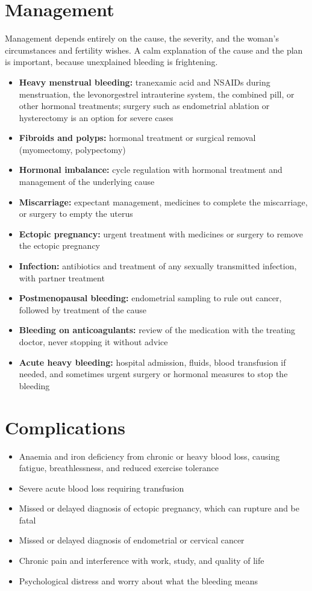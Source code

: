 \section*{Management}
Management depends entirely on the cause, the severity, and the woman's circumstances and fertility wishes. A calm explanation of the cause and the plan is important, because unexplained bleeding is frightening.

\begin{itemize}
    \item \textbf{Heavy menstrual bleeding:} tranexamic acid and NSAIDs during menstruation, the levonorgestrel intrauterine system, the combined pill, or other hormonal treatments; surgery such as endometrial ablation or hysterectomy is an option for severe cases
    \item \textbf{Fibroids and polyps:} hormonal treatment or surgical removal (myomectomy, polypectomy)
    \item \textbf{Hormonal imbalance:} cycle regulation with hormonal treatment and management of the underlying cause
    \item \textbf{Miscarriage:} expectant management, medicines to complete the miscarriage, or surgery to empty the uterus
    \item \textbf{Ectopic pregnancy:} urgent treatment with medicines or surgery to remove the ectopic pregnancy
    \item \textbf{Infection:} antibiotics and treatment of any sexually transmitted infection, with partner treatment
    \item \textbf{Postmenopausal bleeding:} endometrial sampling to rule out cancer, followed by treatment of the cause
    \item \textbf{Bleeding on anticoagulants:} review of the medication with the treating doctor, never stopping it without advice
    \item \textbf{Acute heavy bleeding:} hospital admission, fluids, blood transfusion if needed, and sometimes urgent surgery or hormonal measures to stop the bleeding
\end{itemize}

\section*{Complications}
\begin{itemize}
    \item Anaemia and iron deficiency from chronic or heavy blood loss, causing fatigue, breathlessness, and reduced exercise tolerance
    \item Severe acute blood loss requiring transfusion
    \item Missed or delayed diagnosis of ectopic pregnancy, which can rupture and be fatal
    \item Missed or delayed diagnosis of endometrial or cervical cancer
    \item Chronic pain and interference with work, study, and quality of life
    \item Psychological distress and worry about what the bleeding means
\end{itemize}

